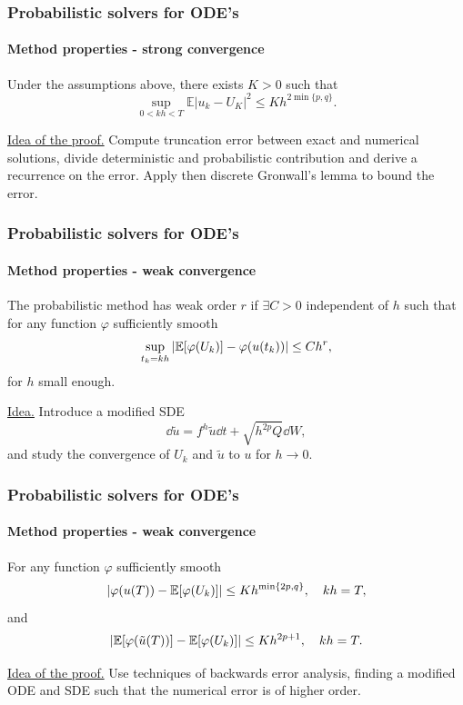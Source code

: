 \documentclass{beamer}
\newcommand{\E}{\mathbb{E}}
\renewcommand{\phi}{\varphi}
\begin{document}
\begin{frame}
	\frametitle{Probabilistic solvers for ODE's}
	\framesubtitle{Method properties - strong convergence \cite{CGS16}}
	
	\begin{theorem} Under the assumptions above, there exists $K>0$ such that
		\begin{equation*}
		\sup_{0<kh<T} \E|u_k - U_K|^2 \leq Kh^{2\min\{p,q\}}.
		\end{equation*}
	\end{theorem}
	
	\underline{Idea of the proof.} Compute truncation error between exact and numerical solutions, divide deterministic and probabilistic contribution and derive a recurrence on the error. Apply then discrete Gronwall's lemma to bound the error.
\end{frame}

\begin{frame}
	\frametitle{Probabilistic solvers for ODE's}
	\framesubtitle{Method properties - weak convergence \cite{CGS16}}

	\begin{definition} The probabilistic method has weak order $r$ if $\exists C > 0$ independent of $h$ such that for any function $\phi$ sufficiently smooth
		\begin{equation*}
		\sup_{t_k = kh} \abs{\E[\phi(U_k)] - \phi(u(t_k))} \leq Ch^r,
		\end{equation*}
		for $h$ small enough.
	\end{definition}
	
	\underline{Idea.} Introduce a modified SDE 
	\begin{equation}
		\dd{\tilde u} = f^h{\tilde u}\dd{t} + \sqrt{h^{2p} Q} \dd{W},
	\end{equation}
	and study the convergence of $U_k$ and $\tilde u$ to $u$ for $h \to 0$.
\end{frame}

\begin{frame}
	\frametitle{Probabilistic solvers for ODE's}
	\framesubtitle{Method properties - weak convergence \cite{CGS16}}

	\begin{theorem} For any function $\phi$ sufficiently smooth
		\begin{equation*}
		\abs{\phi(u(T)) - \E[\phi(U_k)]} \leq Kh^{\min\{2p, q\}}, \quad kh = T,
		\end{equation*}
		and 
		\begin{equation*}
		\abs{\E[\phi(\tilde u(T))] - \E[\phi(U_k)]} \leq Kh^{2p + 1}, \quad kh = T.
		\end{equation*}
	\end{theorem}
	
	\underline{Idea of the proof.} Use techniques of backwards error analysis, finding a modified ODE and SDE such that the numerical error is of higher order.
	
\end{frame}
\end{document}
